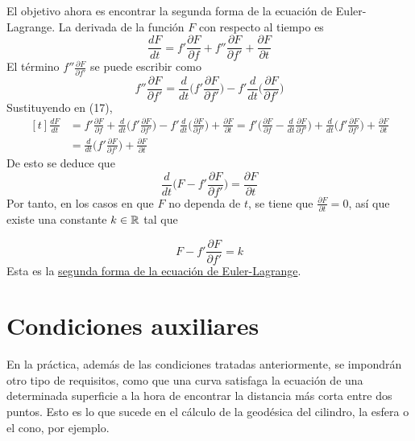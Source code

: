 \documentclass[12pt]{report}
\begin{document}
El objetivo ahora es encontrar la segunda forma de la ecuación de Euler-Lagrange. La derivada de la función $F$ con respecto al tiempo es
\[\frac{dF}{dt} = f' \frac{\partial F}{\partial f} + f''\frac{\partial F}{\partial f'} + \frac{\partial F}{\partial t} \tag{17}\]
El término $f'' \frac{\partial F}{\partial f'}$ se puede escribir como
\[f'' \frac{\partial F}{\partial f'} = \frac{d}{dt}\biggl( f' \frac{\partial F}{\partial f'}\biggr) - f' \frac{d}{dt}\biggl( \frac{\partial F}{\partial f'}\biggr) \]
Sustituyendo en (17),
\[
\begin{aligned}[t]
\frac{dF}{dt} &= f' \frac{\partial F}{\partial f} + \frac{d}{dt}\biggl( f' \frac{\partial F}{\partial f'}\biggr) - f' \frac{d}{dt}\biggl( \frac{\partial F}{\partial f'}\biggr) + \frac{\partial F}{\partial t} = f'\biggl( \frac{\partial F}{\partial f} - \frac{d}{dt}\frac{\partial F}{\partial f'}\biggr)+\frac{d}{dt}\biggl( f' \frac{\partial F}{\partial f'}\biggr) + \frac{\partial F}{\partial t} \\
&= \frac{d}{dt}\biggl( f' \frac{\partial F}{\partial f'}\biggr) + \frac{\partial F}{\partial t}
\end{aligned}
\]
De esto se deduce que
\[\frac{d}{dt}\biggl( F - f'\frac{\partial F}{\partial f'} \biggr) = \frac{\partial F}{\partial t}\]
Por tanto, en los casos en que $F$ no dependa de $t$, se tiene que $\frac{\partial F}{\partial t} = 0$, así que existe una constante $k \in \mathbb R$ tal que

\setlength\fboxsep{0.3cm}
\setlength\fboxrule{1.5pt}
\[\boxed{F - f'\frac{\partial F}{\partial f'} = k}\]
Esta es la \ul{segunda forma de la ecuación de Euler-Lagrange}.

\section{Condiciones auxiliares}

En la práctica, además de las condiciones tratadas anteriormente, se impondrán otro tipo de requisitos, como que una curva satisfaga la ecuación de una determinada superficie a la hora de encontrar la distancia más corta entre dos puntos. Esto es lo que sucede en el cálculo de la geodésica del cilindro, la esfera o el cono, por ejemplo.
\end{document}
